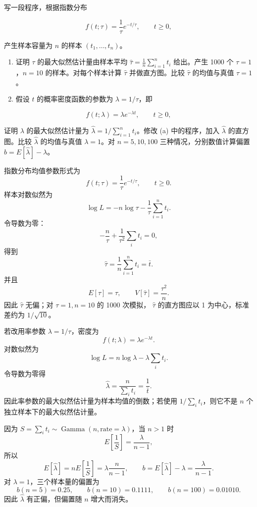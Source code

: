 \begin{question}
写一段程序，根据指数分布

\[
f(t;\tau)=\frac{1}{\tau}e^{-t/\tau},\qquad t\ge0,
\]

产生样本容量为 \(n\) 的样本 \((t_1,\ldots,t_n)\)。

\begin{enumerate}
\item
  证明 \(\tau\) 的最大似然估计量由样本平均
  \(\hat\tau=\frac1n\sum_{i=1}^{n}t_i\) 给出。产生 1000 个
  \(\tau=1\)，\(n=10\) 的样本。对每个样本计算 \(\hat\tau\)
  并做直方图。比较 \(\hat\tau\) 的均值与真值 \(\tau=1\)。
\item
  假设 \(t\) 的概率密度函数的参数为 \(\lambda=1/\tau\)，即
\end{enumerate}

\[
f(t;\lambda)=\lambda e^{-\lambda t},\qquad t\ge0,
\]

证明 \(\lambda\) 的最大似然估计量为
\(\hat\lambda=1/\sum_{i=1}^{n}t_i\)。修改 (a) 中的程序，加入
\(\hat\lambda\) 的直方图。比较 \(\hat\lambda\) 的均值与真值
\(\lambda=1\)。对 \(n=5,10,100\) 三种情况，分别数值计算偏置
\(b=E[\hat\lambda]-\lambda\)。
\begin{solution}
指数分布均值参数形式为
\[
f(t;\tau)=\frac1\tau e^{-t/\tau},\qquad t\ge0.
\]
样本对数似然为
\[
\log L=-n\log\tau-\frac1\tau\sum_{i=1}^n t_i.
\]
令导数为零：
\[
-\frac n\tau+\frac1{\tau^2}\sum_i t_i=0,
\]
得到
\[
\hat\tau=\frac1n\sum_{i=1}^n t_i=\bar t.
\]
并且
\[
E[\hat\tau]=\tau,
\qquad
V[\hat\tau]=\frac{\tau^2}{n}.
\]
因此 \(\hat\tau\) 无偏；对 \(\tau=1,n=10\) 的 1000 次模拟，
\(\hat\tau\) 的直方图应以 1 为中心，标准差约为 \(1/\sqrt{10}\)。

若改用率参数 \(\lambda=1/\tau\)，密度为
\[
f(t;\lambda)=\lambda e^{-\lambda t}.
\]
对数似然为
\[
\log L=n\log\lambda-\lambda\sum_i t_i.
\]
令导数为零得
\[
\hat\lambda=\frac{n}{\sum_i t_i}=\frac1{\bar t}.
\]
因此率参数的最大似然估计量为样本均值的倒数；若使用 \(1/\sum_i t_i\)，则它不是 \(n\) 个独立样本下的最大似然估计量。

因为 \(S=\sum_i t_i\sim\operatorname{Gamma}(n,\text{rate}=\lambda)\)，当
\(n>1\) 时
\[
E\left[\frac1S\right]=\frac{\lambda}{n-1},
\]
所以
\[
E[\hat\lambda]=nE\left[\frac1S\right]
=\lambda\frac{n}{n-1},
\qquad
b=E[\hat\lambda]-\lambda=\frac{\lambda}{n-1}.
\]
对 \(\lambda=1\)，三个样本量的偏置为
\[
b(n=5)=0.25,
\qquad
b(n=10)=0.1111,
\qquad
b(n=100)=0.01010.
\]
因此 \(\hat\lambda\) 有正偏，但偏置随 \(n\) 增大而消失。
\end{solution}
\end{question}



